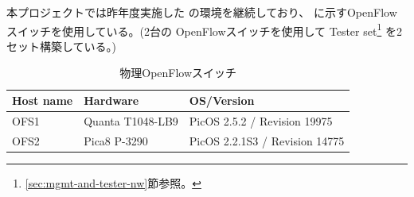 本プロジェクトでは昨年度実施した \lopj の環境を継続しており、
に示すOpenFlowスイッチを使用している。(2台の
OpenFlowスイッチを使用して Tester
set\footnote{\ref{sec:mgmt-and-tester-nw}節参照。} を2セット構築している。)

\begin{table}[h]
 \centering
 \caption{物理OpenFlowスイッチ}
 \label{tab:psw-list}
  \begin{tabular}{l|l|l}
   \hline
   Host name & Hardware & OS/Version \\
   \hline
   \hline
   OFS1 & Quanta T1048-LB9 & PicOS 2.5.2 / Revision 19975 \\
   OFS2 & Pica8 P-3290 & PicOS 2.2.1S3 / Revision 14775 \\
   \hline
 \end{tabular}
\end{table}

